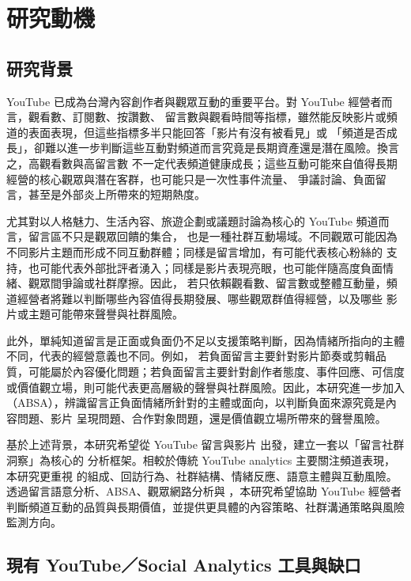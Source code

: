 \section{研究動機}

\subsection{研究背景}

YouTube 已成為台灣內容創作者與觀眾互動的重要平台。對 YouTube 經營者而言，觀看數、訂閱數、按讚數、
留言數與觀看時間等指標，雖然能反映影片或頻道的表面表現，但這些指標多半只能回答「影片有沒有被看見」或
「頻道是否成長」，卻難以進一步判斷這些互動對頻道而言究竟是長期資產還是潛在風險。換言之，高觀看數與高留言數
不一定代表頻道健康成長；這些互動可能來自值得長期經營的核心觀眾與潛在客群，也可能只是一次性事件流量、
爭議討論、負面留言，甚至是外部炎上所帶來的短期熱度。

尤其對以人格魅力、生活內容、旅遊企劃或議題討論為核心的 YouTube 頻道而言，留言區不只是觀眾回饋的集合，
也是一種社群互動場域。不同觀眾可能因為不同影片主題而形成不同互動群體；同樣是留言增加，有可能代表核心粉絲的
支持，也可能代表外部批評者湧入；同樣是影片表現亮眼，也可能伴隨高度負面情緒、觀眾間爭論或社群摩擦。因此，
若只依賴觀看數、留言數或整體互動量，頻道經營者將難以判斷哪些內容值得長期發展、哪些觀眾群值得經營，以及哪些
影片或主題可能帶來聲譽與社群風險。

此外，單純知道留言是正面或負面仍不足以支援策略判斷，因為情緒所指向的主體不同，代表的經營意義也不同。例如，
若負面留言主要針對影片節奏或剪輯品質，可能屬於內容優化問題；若負面留言主要針對創作者態度、事件回應、可信度
或價值觀立場，則可能代表更高層級的聲譽與社群風險。因此，本研究進一步加入 （ABSA），辨識留言正負面情緒所針對的主體或面向，以判斷負面來源究竟是內容問題、影片
呈現問題、合作對象問題，還是價值觀立場所帶來的聲譽風險。

基於上述背景，本研究希望從 YouTube 留言與影片  出發，建立一套以「留言社群洞察」為核心的
分析框架。相較於傳統 YouTube analytics 主要關注頻道表現，本研究更重視 
的組成、回訪行為、社群結構、情緒反應、語意主體與互動風險。透過留言語意分析、ABSA、觀眾網路分析與
，本研究希望協助
YouTube 經營者判斷頻道互動的品質與長期價值，並提供更具體的內容策略、社群溝通策略與風險監測方向。

\subsection{現有 YouTube／Social Analytics 工具與缺口}

